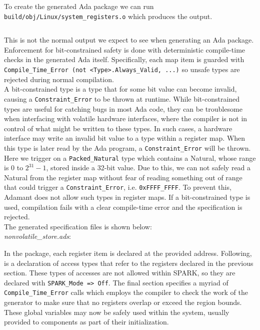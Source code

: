To create the generated Ada package we can run \texttt{build/obj/Linux/system_registers.o} which produces the output.

\vspace{5mm} %
\inputminted{text}{../example_architecture/register_map/output.txt}
\vspace{5mm} %

This is not the normal output we expect to see when generating an Ada package. Enforcement for bit-constrained safety is done with deterministic compile-time checks in the generated Ada itself. Specifically, each map item is guarded with \texttt{Compile\_Time\_Error (not <Type>.Always\_Valid, ...)} so unsafe types are rejected during normal compilation. \\

A bit-constrained type is a type that for some bit value can become invalid, causing a \texttt{Constraint\_Error} to be thrown at runtime. While bit-constrained types are useful for catching bugs in most Ada code, they can be troublesome when interfacing with volatile hardware interfaces, where the compiler is not in control of what might be written to these types. In such cases, a hardware interface may write an invalid bit value to a type within a register map. When this type is later read by the Ada program, a \texttt{Constraint\_Error} will be thrown. Here we trigger on a \texttt{Packed\_Natural} type which contains a Natural, whose range is $0$ to $2^{31} - 1$, stored inside a 32-bit value. Due to this, we can not safely read a Natural from the register map without fear of reading something out of range that could trigger a \texttt{Constraint_Error}, i.e. \texttt{0xFFFF_FFFF}. To prevent this, Adamant does not allow such types in register maps. If a bit-constrained type is used, compilation fails with a clear compile-time error and the specification is rejected. \\

The generated specification files is shown below: \\

\textit{nonvolatile\_store.ads}:

In the package, each register item is declared at the provided address. Following, is a declaration of access types that refer to the registers declared in the previous section. These types of accesses are not allowed within SPARK, so they are declared with \texttt{SPARK\_Mode => Off}. The final section specifies a myriad of \texttt{Compile\_Time\_Error} calls which employs the compiler to check the work of the generator to make sure that no registers overlap or exceed the region bounds. These global variables may now be safely used within the system, usually provided to components as part of their initialization. \\

